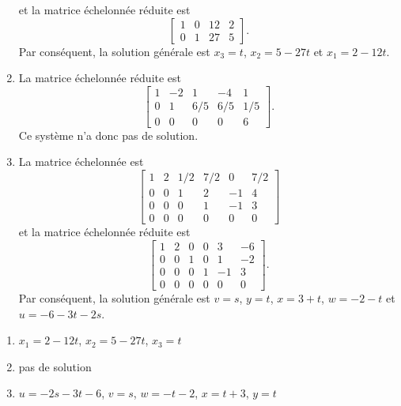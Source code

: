 \begin{exercice}
\begin{sol}
\begin{enumerate}
      et la matrice échelonnée réduite est
      \begin{displaymath}
        \begin{bmatrix}
          1 & 0 & 12 & 2 \\
          0 & 1 & 27 & 5
        \end{bmatrix}.
      \end{displaymath}
      Par conséquent, la solution générale est $x_3 = t$, $x_2 = 5 -
      27t$ et $x_1 = 2 - 12t$.
    \item La matrice échelonnée réduite est
      \begin{displaymath}
        \begin{bmatrix}
          1 & -2 &   1 &  -4 & 1 \\
          0 &  1 & 6/5 & 6/5 & 1/5 \\
          0 &  0 &   0 &   0 &   6
        \end{bmatrix}.
      \end{displaymath}
      Ce système n'a donc pas de solution.
    \item La matrice échelonnée est
      \begin{displaymath}
        \begin{bmatrix}
          1 & 2 & 1/2 & 7/2 &  0 & 7/2 \\
          0 & 0 &   1 &   2 & -1 &   4 \\
          0 & 0 &   0 &   1 & -1 &   3 \\
          0 & 0 &   0 &   0 &  0 &   0
        \end{bmatrix}
      \end{displaymath}
      et la matrice échelonnée réduite est
      \begin{displaymath}
        \begin{bmatrix}
          1 & 2 &   0 &   0 &  3 &  -6 \\
          0 & 0 &   1 &   0 &  1 &  -2 \\
          0 & 0 &   0 &   1 & -1 &   3 \\
          0 & 0 &   0 &   0 &  0 &   0
        \end{bmatrix}.
      \end{displaymath}
      Par conséquent, la solution générale est $v = s$, $y = t$, $x =
      3 + t$, $w = -2 - t$ et $u = -6 - 3t - 2s$.
    \end{enumerate}
  \end{sol}
  \begin{rep}
    \begin{enumerate}
    \item $x_1 = 2 - 12t$, $x_2 = 5 - 27t$, $x_3 = t$
    \item pas de solution
    \item $u = -2s - 3t - 6$,
          $v = s$,
          $w = -t - 2$,
          $x = t + 3$,
          $y = t$
    \end{enumerate}
  \end{rep}
\end{exercice}

